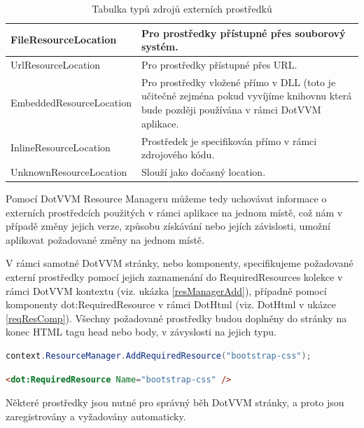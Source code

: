 \begin{table}[H]
	\caption{Tabulka typů zdrojů externích prostředků}
	\label{resLocTable}
	\centering
	\begin{tabular}{m{12em}|m{22em}}
		\toprule
FileResourceLocation           & Pro prostředky přístupné přes souborový systém. \\ \midrule
UrlResourceLocation           & Pro prostředky přístupné přes URL.\\ \midrule
EmbeddedResourceLocation           & Pro prostředky vložené přímo v DLL (toto je učitečné zejména pokud vyvíjíme knihovnu která bude později používána v rámci DotVVM aplikace. \\ \midrule
InlineResourceLocation           & Prostředek je specifikován přímo v rámci zdrojového kódu. \\ \midrule
UnknownResourceLocation           & Slouží jako dočasný location. \\
\bottomrule
\end{tabular}
\end{table}
Pomocí DotVVM Resource Manageru můžeme tedy uchovávat informace o externích prostředcích použitých v rámci aplikace na jednom místě, což nám v případě změny jejich verze, způsobu získávání nebo jejích závislosti, umožní aplikovat požadované změny na jednom místě.

V rámci samotné DotVVM stránky, nebo komponenty, specifikujeme požadované externí prostředky pomocí jejich zaznamenání do RequiredResources kolekce v rámci DotVVM kontextu (viz. ukázka \ref{resManagerAdd}), případně pomocí komponenty dot:RequiredResource v rámci DotHtml (viz. DotHtml v ukázce \ref{reqResComp}).
Všechny požadované prostředky budou doplněny do stránky na konec HTML tagu head nebo body, v závyslosti na jejich typu.

\begin{lstlisting}[language=c#, caption=Specifikace požadovaného prostředku v rámci C# kódu,label=resManagerAdd,captionpos=t]
context.ResourceManager.AddRequiredResource("bootstrap-css");

\end{lstlisting}

\begin{lstlisting}[language=Html, caption=Specifikace požadovaného prostředku v rámci DotHtml,label=reqResComp,captionpos=t]
<dot:RequiredResource Name="bootstrap-css" />

\end{lstlisting}
Některé prostředky jsou nutné pro správný běh DotVVM stránky, a proto jsou zaregistrovány a vyžadovány automaticky.

